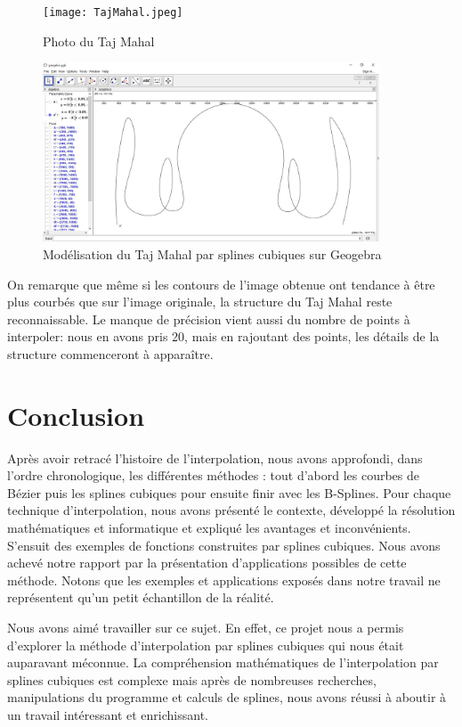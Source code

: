 \documentclass{article}
\begin{document}
\begin{figure}[h]
	\centering
	\texttt{[image: TajMahal.jpeg]}
	\caption{Photo du Taj Mahal}
\end{figure}

\begin{figure}[h]
	\centering
	\includegraphics[width=10cm]{GeogebraTajMahal.JPG}
	\caption{Mod\'elisation du Taj Mahal par splines cubiques sur Geogebra}
\end{figure}

On remarque que m\^{e}me si les contours de l'image obtenue ont tendance \`a \^{e}tre plus courb\'{e}s que sur l'image originale, la structure du Taj Mahal reste reconnaissable. Le manque de pr\'{e}cision vient aussi du nombre de points \`a interpoler: nous en avons pris 20, mais en rajoutant des points, les d\'{e}tails de la structure commenceront \`a appara\^itre.

\newpage
\section{Conclusion}

\indent
Apr\`{e}s avoir retrac\'{e} l'histoire de l'interpolation, nous avons approfondi, dans l'ordre chronologique, les diff\'{e}rentes m\'{e}thodes : tout d'abord les courbes de B\'{e}zier puis les splines cubiques pour ensuite finir avec les B-Splines. Pour chaque technique d'interpolation, nous avons pr\'{e}sent\'{e} le contexte, d\'{e}velopp\'{e} la r\'{e}solution math\'{e}matiques et informatique et expliqu\'{e} les avantages et inconv\'{e}nients. S'ensuit des exemples de fonctions construites par splines cubiques. Nous avons achev\'{e} notre rapport par la pr\'{e}sentation d'applications possibles de cette m\'{e}thode. Notons que les exemples et applications expos\'{e}s dans notre travail ne repr\'{e}sentent qu'un petit \'{e}chantillon de la r\'{e}alit\'{e}.
\

Nous avons aim\'{e} travailler sur ce sujet. En effet, ce projet nous a permis d'explorer la m\'{e}thode d'interpolation par splines cubiques qui nous \'{e}tait auparavant m\'{e}connue. La compr\'{e}hension math\'{e}matiques de l'interpolation par splines cubiques est complexe mais apr\`{e}s de nombreuses recherches, manipulations du programme et calculs de splines, nous avons r\'{e}ussi \`{a} aboutir \`{a} un travail int\'{e}ressant et enrichissant.
\
\end{document}
